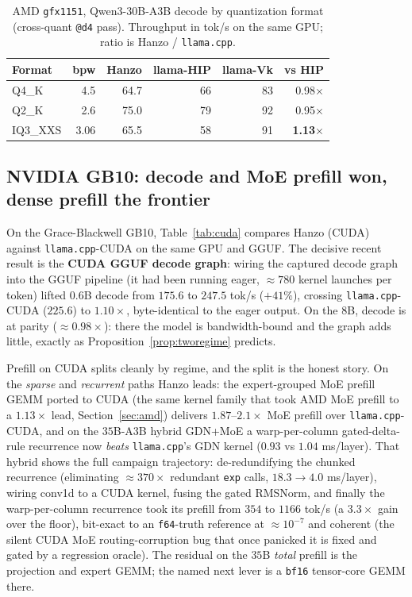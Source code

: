 \documentclass[11pt]{article}
\begin{document}
\begin{table}[t]
\centering
\caption{AMD \texttt{gfx1151}, Qwen3-30B-A3B decode by quantization format (cross-quant
\texttt{@d4} pass). Throughput in tok/s on the same GPU; ratio is Hanzo / \texttt{llama.cpp}.}
\label{tab:ladder}
\begin{tabular}{l r rr rr}
\toprule
\textbf{Format} & \textbf{bpw} & \textbf{Hanzo} & \textbf{llama-HIP} & \textbf{llama-Vk} & \textbf{vs HIP} \\
\midrule
Q4\_K   & 4.5  & 64.7 & 66 & 83 & 0.98$\times$ \\
Q2\_K   & 2.6  & 75.0 & 79 & 92 & 0.95$\times$ \\
IQ3\_XXS & 3.06 & 65.5 & 58 & 91 & \textbf{1.13$\times$} \\
\bottomrule
\end{tabular}
\end{table}

\subsection{NVIDIA GB10: decode and MoE prefill won, dense prefill the frontier}
\label{sec:cuda}

On the Grace-Blackwell GB10, Table~\ref{tab:cuda} compares Hanzo (CUDA) against
\texttt{llama.cpp}-CUDA on the same GPU and GGUF. The decisive recent result is the \textbf{CUDA GGUF
decode graph}: wiring the captured decode graph into the GGUF pipeline (it had been running eager,
$\approx 780$ kernel launches per token) lifted $0.6$B decode from $175.6$ to $247.5$ tok/s ($+41\%$),
crossing \texttt{llama.cpp}-CUDA ($225.6$) to $1.10\times$, byte-identical to the eager output. On the
$8$B, decode is at parity ($\approx 0.98\times$): there the model is bandwidth-bound and the graph adds
little, exactly as Proposition~\ref{prop:tworegime} predicts.

Prefill on CUDA splits cleanly by regime, and the split is the honest story. On the \emph{sparse} and
\emph{recurrent} paths Hanzo leads: the expert-grouped MoE prefill GEMM ported to CUDA (the same kernel
family that took AMD MoE prefill to a $1.13\times$ lead, Section~\ref{sec:amd}) delivers
$1.87$--$2.1\times$ MoE prefill over \texttt{llama.cpp}-CUDA, and on the $35$B-A3B hybrid GDN+MoE a
warp-per-column gated-delta-rule recurrence now \emph{beats} \texttt{llama.cpp}'s GDN kernel ($0.93$ vs
$1.04$ ms/layer). That hybrid shows the full campaign trajectory: de-redundifying the chunked recurrence
(eliminating $\approx 370\times$ redundant \texttt{exp} calls, $18.3 \to 4.0$ ms/layer), wiring conv1d to
a CUDA kernel, fusing the gated RMSNorm, and finally the warp-per-column recurrence took its prefill from
$354$ to $1166$ tok/s (a $3.3\times$ gain over the floor), bit-exact to an \texttt{f64}-truth reference at
$\approx 10^{-7}$ and coherent (the silent CUDA MoE routing-corruption bug that once panicked it is fixed
and gated by a regression oracle). The residual on the $35$B \emph{total} prefill is the projection and
expert GEMM; the named next lever is a \texttt{bf16} tensor-core GEMM there.
\end{document}
